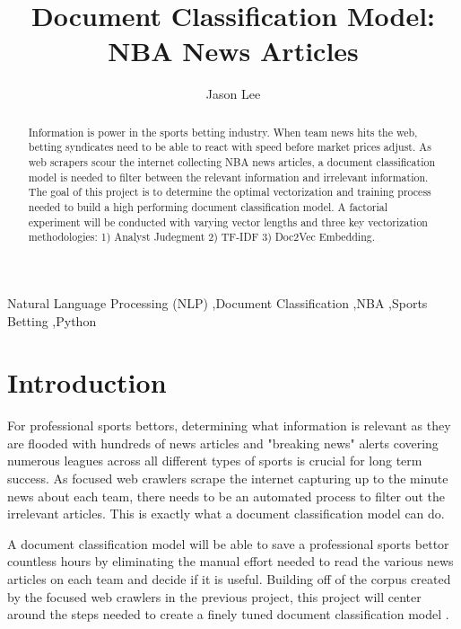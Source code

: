 \documentclass[5p,authoryear]{elsarticle}
\begin{document}
\begin{frontmatter}

\title{Document Classification Model: \\NBA News Articles}
\author{Jason Lee}
\address{Northwestern University, SPS \\Natural Language Processing \\2020SP MSDS 453-56}


\begin{abstract}
Information is power in the sports betting industry. 
When team news hits the web, betting syndicates need to be able to react with speed before market prices adjust.
As web scrapers scour the internet collecting NBA news articles, a document classification model is needed to filter between the relevant information and irrelevant information.
The goal of this project is to determine the optimal vectorization and training process needed to build a high performing document classification model. 
A factorial experiment will be conducted with varying vector lengths and three key vectorization methodologies: 1) Analyst Judegment 2) TF-IDF 3) Doc2Vec Embedding. 
\end{abstract}


\begin{keyword}
Natural Language Processing (NLP) \sep Document Classification \sep NBA \sep Sports Betting \sep Python 
\end{keyword}

\end{frontmatter}


\section{Introduction}\label{introduction}

For professional sports bettors, determining what information is relevant as they are flooded with hundreds of news articles and "breaking news" alerts covering numerous leagues across all different types of sports is crucial for long term success. 
As focused web crawlers scrape the internet capturing up to the minute news about each team, there needs to be an automated process to filter out the irrelevant articles. 
This is exactly what a document classification model can do. 

A document classification model will be able to save a professional sports bettor countless hours by eliminating the manual effort needed to read the various news articles on each team and decide if it is useful.  
Building off of the corpus created by the focused web crawlers in the previous project, this project will center around the steps needed to create a finely tuned document classification model \citep{project1}. 
\end{document}
